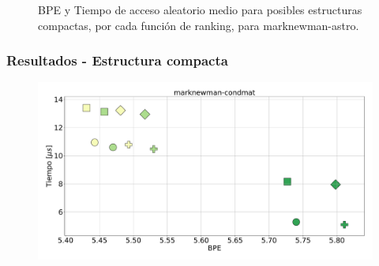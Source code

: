 \begin{frame}
\begin{figure}
	\caption{BPE y Tiempo de acceso aleatorio medio para posibles estructuras compactas, por cada función de ranking, para marknewman-astro.}
\end{figure}

\end{frame}

\begin{frame}
\frametitle{Resultados - Estructura compacta}

\begin{figure}
	\centering
	
    	\begin{minipage}{1\textwidth}
    		\centering
    		\begin{minipage}{0.8\textwidth}
    			\centering
    			\includegraphics[width=1\linewidth]{../img/sdsl/aleatorioBig/marknewman-condmat.pdf}
    		\end{minipage}
    		\begin{minipage}{0.15\textwidth}
    			\centering

\end{minipage}
\end{minipage}
\end{figure}
\end{frame}
